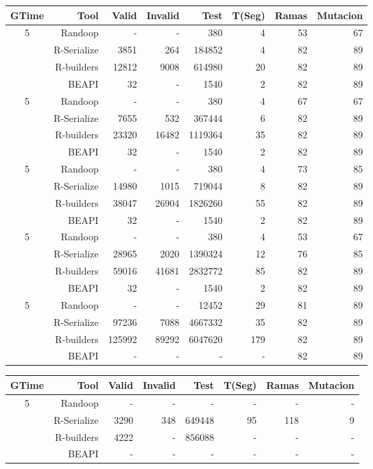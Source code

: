 \begin{table}[H]
\scriptsize
\centering
\label{tab:results-obj1}
\begin{tabular}{ c  r  |r | r | r|r|r|r  }
  \toprule
  \textbf{GTime} & \textbf{Tool} & \textbf{Valid}  & \textbf{Invalid} & \textbf{Test}&\textbf{T(Seg)} &\textbf{Ramas}  & \textbf{Mutacion} \\ 
  \midrule
5	&	Randoop	&	-	&	- & 380 & 4	& 53 & 67 \\
& R-Serialize	& 3851 & 264 & 184852 & 4	& 82 &	89 	\\
& R-builders	& 12812 & 9008 & 614980 & 20 &	82	& 89  \\
&	BEAPI & 32 & - & 1540 & 2	& 82 & 89 \\
\cline{2-8}
5	&	Randoop	&	-	&	- & 380 & 4	& 67 & 67 \\
& R-Serialize	& 7655 & 532 & 367444 & 6	& 82 &	89 	\\
& R-builders	& 23320 & 16482 & 1119364 & 35 &	82	& 89  \\
&	BEAPI & 32 & - & 1540 & 2	& 82 & 89 \\
\cline{2-8}
5	&	Randoop	&	-	&	- & 380 & 4	& 73 & 85 \\
& R-Serialize	& 14980 & 1015 & 719044 & 8	& 82 &	89 	\\
& R-builders	& 38047 & 26904 & 1826260 & 55 &	82	& 89  \\
&	BEAPI & 32 & - & 1540 & 2	& 82 & 89 \\

\cline{2-8}
5	&	Randoop	&	-	&	- & 380 & 4	& 53 & 67 \\
& R-Serialize	& 28965 & 2020 & 1390324 & 12		& 76 &	85 	\\
& R-builders	& 59016 & 41681 & 2832772 & 85 	& 82 &	89 	  \\
&	BEAPI & 32 & - & 1540 & 2	& 82 &	89 \\
\cline{2-8}
5	&	Randoop	&	-	&	- & 12452 & 29	& 81 & 89\\
& R-Serialize	& 97236 & 7088 & 4667332 & 35	& 82 &	89 	\\
& R-builders	& 125992 & 89292 & 6047620 & 179 & 82 &	89  \\
&	BEAPI & - & - & - & -	& 82 &	89 \\
\end{tabular}
\end{table}


\begin{table}[H]
\scriptsize
\centering
\label{tab:results-obj1}
\begin{tabular}{ c  r  |r | r | r|r|r|r  }
  \toprule
  \textbf{GTime} & \textbf{Tool} & \textbf{Valid}  & \textbf{Invalid} & \textbf{Test}&\textbf{T(Seg)} &\textbf{Ramas}  & \textbf{Mutacion} \\ 
  \midrule

5	&	Randoop	&	-	&	- & - & -	& - & - \\
& R-Serialize	& 3290 & 348 & 649448 & 95	& 118 &	9	\\			
& R-builders	& 4222 & - & 856088 & - &	-	& -  \\				
&	BEAPI & - & - & - & -	& - & - \\		


\end{tabular}
\end{table}